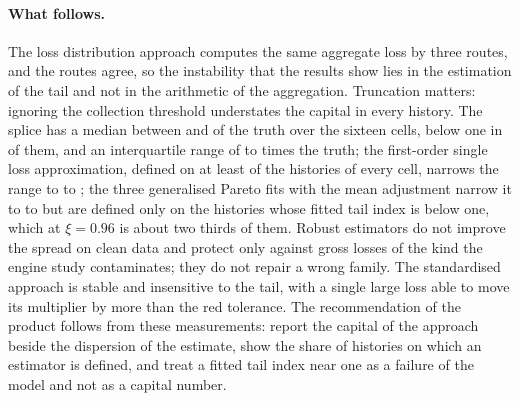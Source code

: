 \paragraph{What follows.} The loss distribution approach computes the same aggregate loss by three routes, and the routes agree, so the instability that the results show lies in the estimation of the tail and not in the arithmetic of the aggregation.
Truncation matters: ignoring the collection threshold understates the capital in every history. The splice has a median between \opSpMedLo{} and \opSpMedHi{} of the truth over the sixteen cells, below one in \opSpMedBelowOne{} of them, and an interquartile range of \opIqrLoSp{} to \opIqrHiSp{} times the truth; the first-order single loss approximation, defined on at least \opSlaNdMin{} of the \opNRep{} histories of every cell, narrows the range to \opIqrLoSla{} to \opIqrHiSla{}; the three
generalised Pareto fits with the mean adjustment narrow it to \opGpdIqrLo{} to \opGpdIqrHi{} but are defined only on the histories whose fitted tail index is below one, which at $\xi=0.96$ is about two thirds of them. Robust estimators do not improve the spread on clean data and protect only against gross losses of the kind the engine study
contaminates; they do not repair a wrong family. The standardised approach is stable and insensitive to the tail, with a single large loss able to move its multiplier by more than the red tolerance. The recommendation of the product follows from these
measurements: report the capital of the approach beside the dispersion of the estimate, show the share of histories on which an estimator is defined, and treat a fitted tail index near one as a failure of the model and not as a capital number.
